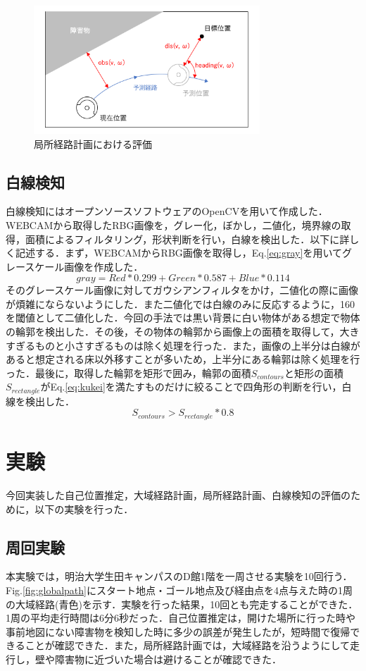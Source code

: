 \documentclass{jarticle}
\begin{document}
\begin{figure}
	\includegraphics[width=8.5cm]{./picture/DWA.png}
	\caption{局所経路計画における評価}
	\label{fig:DWA}
\end{figure}

\subsection{白線検知}
白線検知にはオープンソースソフトウェアのOpenCV\cite{opencv}を用いて作成した．WEBCAMから取得したRBG画像を，グレー化，ぼかし，二値化，境界線の取得，面積によるフィルタリング，形状判断を行い，白線を検出した．以下に詳しく記述する．まず，WEBCAMからRBG画像を取得し，Eq.\ref{eq:gray}を用いてグレースケール画像を作成した．
\begin{equation}
	gray = Red * 0.299 +  Green * 0.587 + Blue * 0.114
	\label{eq:gray}
\end{equation}
そのグレースケール画像に対してガウシアンフィルタをかけ，二値化の際に画像が煩雑にならないようにした．また二値化では白線のみに反応するように，160を閾値として二値化した．今回の手法では黒い背景に白い物体がある想定で物体の輪郭を検出した．その後，その物体の輪郭から画像上の面積を取得して，大きすぎるものと小さすぎるものは除く処理を行った．また，画像の上半分は白線があると想定される床以外移すことが多いため，上半分にある輪郭は除く処理を行った．最後に，取得した輪郭を矩形で囲み，輪郭の面積$S_{contours}$と矩形の面積$S_{rectangle}$がEq.\ref{eq:kukei}を満たすものだけに絞ることで四角形の判断を行い，白線を検出した．
\begin{equation}
	S_{contours} > S_{rectangle} * 0.8
	\label{eq:kukei}
\end{equation}
\section{実験}
今回実装した自己位置推定，大域経路計画，局所経路計画、白線検知の評価のために，以下の実験を行った．
\subsection{周回実験}
本実験では，明治大学生田キャンパスのD館1階を一周させる実験を10回行う．Fig.\ref{fig:globalpath}にスタート地点・ゴール地点及び経由点を4点与えた時の1周の大域経路(青色)を示す．実験を行った結果，10回とも完走することができた．1周の平均走行時間は6分6秒だった．自己位置推定は，開けた場所に行った時や事前地図にない障害物を検知した時に多少の誤差が発生したが，短時間で復帰できることが確認できた．また，局所経路計画では，大域経路を沿うようにして走行し，壁や障害物に近づいた場合は避けることが確認できた．
\end{document}
